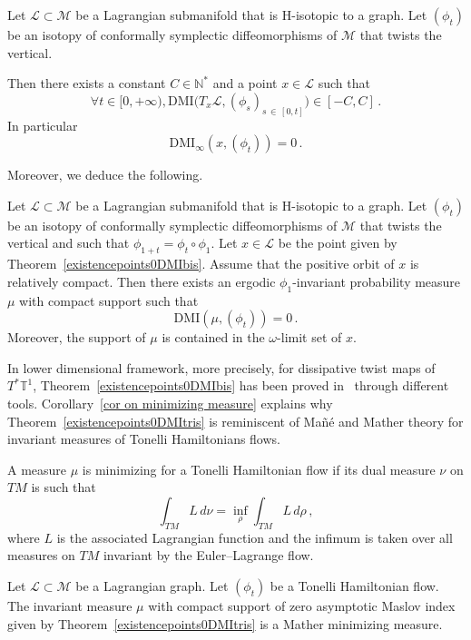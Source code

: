 \documentclass[AHL, Unicode, longabstracts, published]{cedram}
\newcommand*\M{\mathcal{M}}
\newcommand*\cl{\mathcal{L}}
\newcommand*\cal{\mathcal}
\newcommand{\DMI}{\mathrm{DMI}}
\newcommand*\N{\mathbb{N}}
\newcommand*\T{\mathbb{T}}
\let\oldforall\forall
\renewcommand*{\forall}{\mathrel{\oldforall}}
\begin{document}
\begin{theo}\label{existencepoints0DMIbis}
Let $\cl\subset \M $ be a Lagrangian submanifold that is {H-isotopic to a graph}. Let $(\phi_t)$ be an isotopy of conformally symplectic diffeomorphisms of $\M$ that twists the vertical.


Then there exists a constant $C\in \N^*$ and a point $x\in \cl$ such that
\[
\forall t\in [0, +\infty), \DMI\big(T_x\cl, (\phi_s)_{s\,\in\,[0, t]}\big)\in [-C, C]\,.
\]
In particular
\[
\DMI_\infty(x,(\phi_t))=0\,.
\]
\end{theo}

Moreover, we deduce the following.

\begin{theo}\label{existencepoints0DMItris}
Let $\cl\subset \M $ be a Lagrangian submanifold that is {H-isotopic to a graph}. Let $(\phi_t)$ be an isotopy of conformally symplectic diffeomorphisms of $\M$ that twists the vertical and such that $\phi_{1+t}=\phi_t\circ\phi_1$. Let $x\in\cl$ be the point given by Theorem~\ref{existencepoints0DMIbis}. Assume that the positive orbit of $x$ is relatively compact. Then there exists an ergodic $\phi_1$-invariant probability measure $\mu$ with compact support such that
\[
\DMI(\mu, (\phi_t)
)=0\,.
\]
Moreover, the support of $\mu$ is contained in the $\omega$-limit set of $x$.
\end{theo}

In lower dimensional framework, more precisely, for dissipative twist maps of $T^*\T^1$, Theorem~\ref{existencepoints0DMIbis} has been proved in~\cite{Flo20} through different tools. Corollary~\ref{cor on minimizing measure} explains why Theorem~\ref{existencepoints0DMItris} is reminiscent of Mañé and Mather theory for invariant measures of Tonelli Hamiltonians flows.


\begin{defi}
A measure $\mu$ is minimizing for a Tonelli Hamiltonian flow if its dual measure $\nu$ on $TM$ is such that
\[
\int_{TM}L\,d\nu = \inf_{\rho}\int_{TM}L\,d\rho\,,
\]
where $L$ is the associated Lagrangian function and the infimum is taken over all measures on $TM$ invariant by the Euler--Lagrange flow.
\end{defi}


\begin{coro}\label{cor on minimizing measure}
Let $\cl\subset\cal M$ be a Lagrangian graph. Let $(\phi_t)$ be a Tonelli Hamiltonian flow. The invariant measure $\mu$ with compact support of zero asymptotic Maslov index given by Theorem~\ref{existencepoints0DMItris} is a Mather minimizing measure.
\end{coro}
\end{document}
